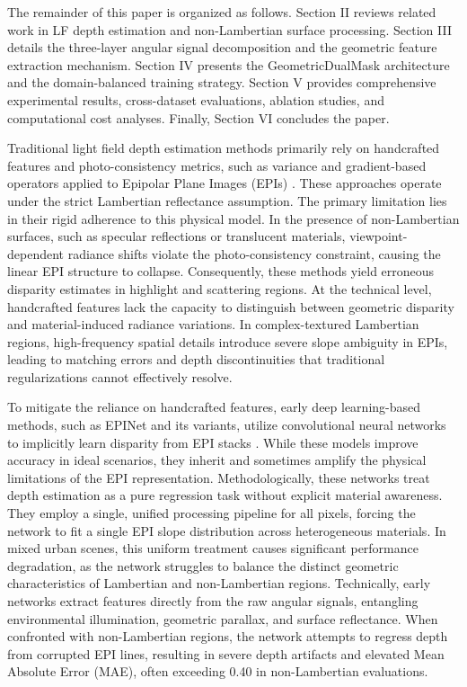 \documentclass[lettersize,journal]{IEEEtran}
\begin{document}
The remainder of this paper is organized as follows. Section II reviews related work in LF depth estimation and non-Lambertian surface processing. Section III details the three-layer angular signal decomposition and the geometric feature extraction mechanism. Section IV presents the GeometricDualMask architecture and the domain-balanced training strategy. Section V provides comprehensive experimental results, cross-dataset evaluations, ablation studies, and computational cost analyses. Finally, Section VI concludes the paper.

Traditional light field depth estimation methods primarily rely on handcrafted features and photo-consistency metrics, such as variance and gradient-based operators applied to Epipolar Plane Images (EPIs) . These approaches operate under the strict Lambertian reflectance assumption. The primary limitation lies in their rigid adherence to this physical model. In the presence of non-Lambertian surfaces, such as specular reflections or translucent materials, viewpoint-dependent radiance shifts violate the photo-consistency constraint, causing the linear EPI structure to collapse. Consequently, these methods yield erroneous disparity estimates in highlight and scattering regions. At the technical level, handcrafted features lack the capacity to distinguish between geometric disparity and material-induced radiance variations. In complex-textured Lambertian regions, high-frequency spatial details introduce severe slope ambiguity in EPIs, leading to matching errors and depth discontinuities that traditional regularizations cannot effectively resolve.

To mitigate the reliance on handcrafted features, early deep learning-based methods, such as EPINet and its variants, utilize convolutional neural networks to implicitly learn disparity from EPI stacks \cite{heber2018}. While these models improve accuracy in ideal scenarios, they inherit and sometimes amplify the physical limitations of the EPI representation. Methodologically, these networks treat depth estimation as a pure regression task without explicit material awareness. They employ a single, unified processing pipeline for all pixels, forcing the network to fit a single EPI slope distribution across heterogeneous materials. In mixed urban scenes, this uniform treatment causes significant performance degradation, as the network struggles to balance the distinct geometric characteristics of Lambertian and non-Lambertian regions. Technically, early networks extract features directly from the raw angular signals, entangling environmental illumination, geometric parallax, and surface reflectance. When confronted with non-Lambertian regions, the network attempts to regress depth from corrupted EPI lines, resulting in severe depth artifacts and elevated Mean Absolute Error (MAE), often exceeding 0.40 in non-Lambertian evaluations.
\end{document}
